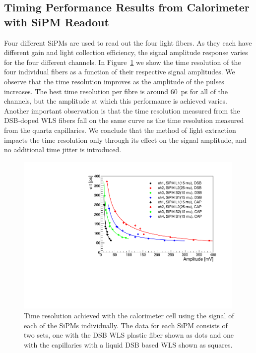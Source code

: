 \subsection{Timing Performance Results from Calorimeter with SiPM Readout}
\label{sec:beamtiming}

Four different SiPMs are used to read out the four light fibers. As they each have
different gain and light collection efficiency, the signal amplitude response varies
for the four different channels. In Figure~\ref{TimeResolution} we show the time 
resolution of the four individual fibers as a function of their respective signal 
amplitudes. We observe that the time resolution improves as the amplitude of the pulses 
increases. The best time resolution per fibre is around $60$~ps for all of the channels, 
but the amplitude at which this performance is achieved varies.
Another important observation is that the time resolution measured from
the DSB-doped WLS fibers fall on the same curve as the time resolution measured from
the quartz capillaries. We conclude that the method of light extraction
impacts the time resolution only through its effect on the signal amplitude, and
no additional time jitter is introduced. 

%
\begin{figure}[htb]
\includegraphics[width=0.99\textwidth]{figures/ShashlikTimeResolution.pdf}
\caption{\label{TimeResolution} Time resolution achieved with the calorimeter cell using the signal of each 
of the  SiPMs individually. The data for each SiPM consists of two sets, one with the DSB WLS plastic fiber shown as 
dots and one with the capillaries with a liquid DSB based WLS shown as squares. }
\end{figure}
%


